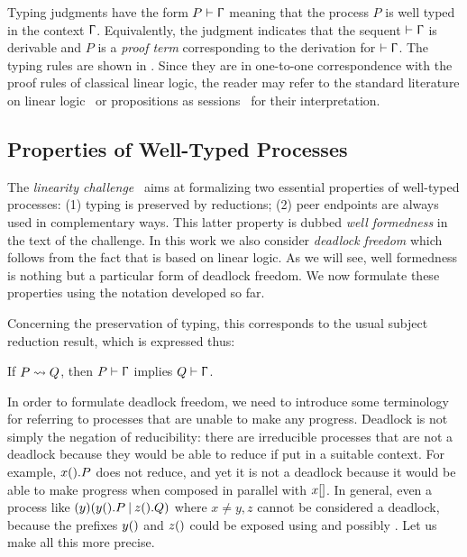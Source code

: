 Typing judgments have the form $\wtp{P}\Context$ meaning that the process $P$ is
well typed in the context $\Upgamma$. Equivalently, the judgment indicates that
the sequent $\wtp{}\Context$ is derivable and $P$ is a \emph{proof term}
corresponding to the derivation for $\wtp{}\Context$.
%
The typing rules are shown in . Since they are in
one-to-one correspondence with the proof rules of classical linear logic, the
reader may refer to the standard literature on linear logic~\cite{} or
propositions as sessions~\citep{Wadler14} for their interpretation.

\subsection{Properties of Well-Typed Processes}
\label{sec:properties}

The \emph{linearity challenge}~\citep{CarboneEtAl24} aims at formalizing two
essential properties of well-typed processes: (1) typing is preserved by
reductions; (2) peer endpoints are always used in complementary ways. This
latter property is dubbed \emph{well formedness} in the text of the challenge.
In this work we also consider \emph{deadlock freedom} which follows from the
fact that \Calculus is based on linear logic. As we will see, well formedness is
nothing but a particular form of deadlock freedom. We now formulate these
properties using the notation developed so far.

Concerning the preservation of typing, this corresponds to the usual subject
reduction result, which is expressed thus:

\begin{theorem}
    \label{thm:red}
    If $P \leadsto Q$, then $\wtp{P}\Context$ implies $\wtp{Q}\Context$.
\end{theorem}

In order to formulate deadlock freedom, we need to introduce some terminology
for referring to processes that are unable to make any progress. Deadlock is not
simply the negation of reducibility: there are irreducible processes that are
not a deadlock because they would be able to reduce if put in a suitable
context. For example, $x().P$ does not reduce, and yet it is not a deadlock
because it would be able to make progress when composed in parallel with
$x[]$. In general, even a process like $(y)(y().P\mathbin|z().Q)$ where
$x\ne y,z$ cannot be considered a deadlock, because the prefixes $y()$ and
$z()$ could be exposed using \SWait and possibly \SComm. Let us make all
this more precise.

